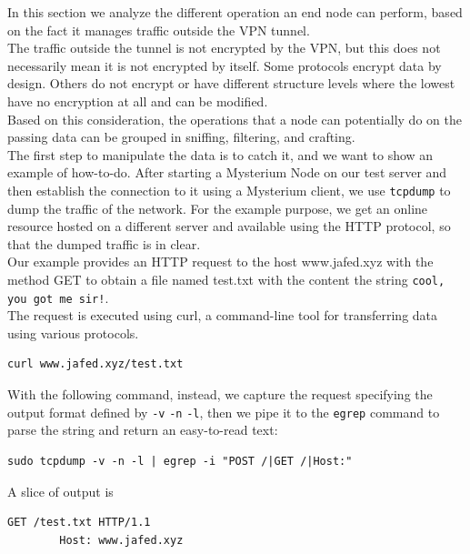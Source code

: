 \documentclass[12pt]{article}
\begin{document}
	In this section we analyze the different operation an end node can perform, based on the fact it manages traffic outside the VPN tunnel.\\
	The traffic outside the tunnel is not encrypted by the VPN, but this does not necessarily mean it is not encrypted by itself. Some protocols encrypt data by design. Others do not encrypt or have different structure levels where the lowest have no encryption at all and can be modified.\\ Based on this consideration, the operations that a node can potentially do on the passing data can be grouped in sniffing, filtering, and crafting.\\
	The first step to manipulate the data is to catch it, and we want to show an example of how-to-do. After starting a Mysterium Node on our test server and then establish the connection to it using a Mysterium client, we use \lstinline{tcpdump} to dump the traffic of the network. For the example purpose, we get an online resource hosted on a different server and available using the HTTP protocol, so that the dumped traffic is in clear.\\
	Our example provides an HTTP request to the host www.jafed.xyz with the method GET to obtain a file named test.txt with the content the string \lstinline{cool, you got me sir!}.\\
	The request is executed using curl, a command-line tool for transferring data using various protocols.\\

	\begin{lstlisting}[frame=single]
		curl www.jafed.xyz/test.txt
	\end{lstlisting}
	
	With the following command, instead, we capture the request specifying the output format defined by \lstinline{-v} \lstinline{-n} \lstinline{-l}, then we pipe it to the \lstinline{egrep} command to parse the string and return an easy-to-read text:\\
	
	\begin{lstlisting}[frame=single]
		sudo tcpdump -v -n -l | egrep -i "POST /|GET /|Host:"
	\end{lstlisting}

	A slice of output is\\
	
	\begin{lstlisting}[frame=single]
		GET /test.txt HTTP/1.1
        Host: www.jafed.xyz
	\end{lstlisting}
\end{document}
